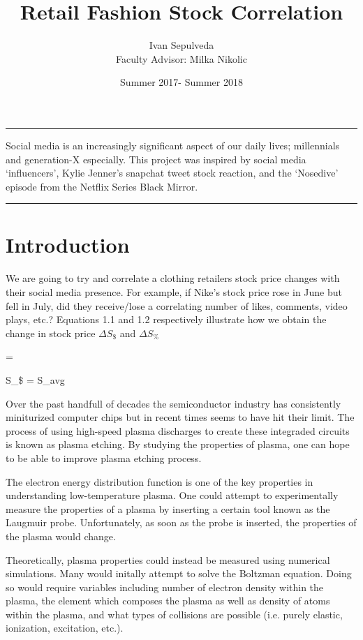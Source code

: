 \documentclass[12pt]{article}
\title{Retail Fashion Stock Correlation\vspace{-2ex}}
\author{Ivan Sepulveda \\ Faculty Advisor: Milka Nikolic}
\date{\vspace{-1.5ex}Summer 2017-  Summer 2018\vspace{-2ex}}
\begin{document}
\maketitle
\hrule
\vspace{2ex}
Social media is an increasingly significant aspect of our daily lives; millennials and generation-X especially. This project was inspired by social media ‘influencers’, Kylie Jenner’s snapchat tweet stock reaction, and the ‘Nosedive’ episode from the Netflix Series Black Mirror. 
\vspace{1ex}
\hrule


\section{Introduction}
We are going to try and correlate a clothing retailers stock price changes with their social media presence. For example, if Nike’s stock price rose in June but fell in July, did they receive/lose a correlating number of likes, comments, video plays, etc.? Equations 1.1 and 1.2 respectively illustrate how we obtain the change in stock price $\Delta S_\$$ and $\Delta S_\% $



\beqn
{}= 
\label{Newtons 2nd law}
\eeqn



\beqn
\Delta S_\$ = S_{avg}
\label{Newtons 2nd law}
\eeqn

Over the past handfull of decades the semiconductor industry has consistently miniturized computer chips but in recent times seems to 
have hit their limit. The process of using high-speed plasma discharges to create these integraded circuits is known as plasma etching. 
By studying the properties of plasma, one can hope to be able to improve plasma etching process.

The electron energy distribution function is one of the key properties in understanding low-temperature plasma. One could attempt to 
experimentally measure the properties of a plasma by inserting a certain tool known as the Laugmuir probe. Unfortunately, as soon as 
the probe is inserted, the properties of the plasma would change. 

Theoretically, plasma properties could instead be measured using numerical simulations. Many would initally attempt to solve the 
Boltzman equation. Doing so would require variables including number of electron density within the plasma, the element which 
composes the plasma as well as density of atoms within the plasma, and what types of collisions are possible (i.e. purely elastic, 
ionization, excitation, etc.).
\end{document}
